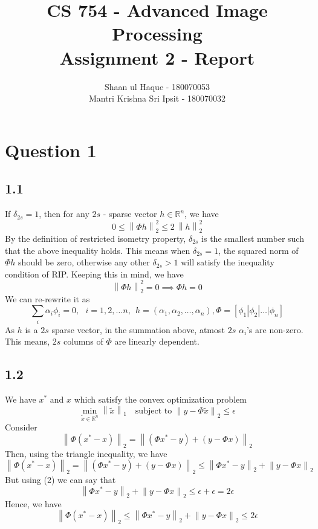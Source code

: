 \documentclass[12pt]{article}
\title{CS 754 - Advanced Image Processing\\Assignment 2 - Report}
\author{Shaan ul Haque - 180070053\\Mantri Krishna Sri Ipsit - 180070032}
\newcommand{\norm}[1]{\left\lVert #1 \right\rVert}
\newcommand{\R}{\mathbb{R}}
\begin{document}
\maketitle

\section*{Question 1}
\subsection*{1.1}
If $\delta_{2s} = 1$, then for any $2s$ - sparse vector $h \in \R^n$, we have
\begin{equation}
0 \leq \norm{\Phi h}_2^2 \leq 2\: \norm{h}_2^2
\end{equation}
By the definition of restricted isometry property, $\delta_{2s}$ is the smallest number such that the above inequality holds. This means when $\delta_{2s} = 1$, the squared norm of $\Phi h$ should be zero, otherwise any other $\delta_{2s} > 1$ will satisfy the inequality condition of RIP. Keeping this in mind, we have
$$\norm{\Phi h}_2^2 = 0 \implies \Phi h = 0$$
We can re-rewrite it as
$$\sum \limits_{i}\alpha_i \phi_i = 0, \:\:\: i=1,2,\ldots n, \:\: h=(\alpha_1, \alpha_2, \ldots, \alpha_n), \Phi = [\phi_1|\phi_2|\ldots|\phi_n]$$
As $h$ is a $2s$ sparse vector, in the summation above, atmost $2s$ $\alpha_i$'s are non-zero. This means, $2s$ columns of $\Phi$ are linearly dependent. 
\subsection*{1.2}
We have $x^*$ and $x$ which satisfy the convex optimization problem
\begin{equation}
\min _{\tilde{x}\in \R^n} \norm{\tilde{x}}_1 \:\:\: \text{ subject to } \norm{y - \Phi \tilde{x}}_2 \leq \epsilon
\end{equation}
Consider
$$\norm{\Phi(x^* - x)}_2 = \norm{(\Phi x^* - y) + (y - \Phi x)}_2$$
Then, using the triangle inequality, we have
$$\norm{\Phi(x^* - x)}_2 = \norm{(\Phi x^* - y) + (y - \Phi x)}_2 \leq \norm{\Phi x^* - y}_2 + \norm{y-\Phi x}_2$$
But using (2) we can say that
$$\norm{\Phi x^* - y}_2 + \norm{y-\Phi x}_2 \leq \epsilon + \epsilon = 2\epsilon$$
Hence, we have
$$\norm{\Phi(x^* - x)}_2 \leq \norm{\Phi x^* - y}_2 + \norm{y-\Phi x}_2 \leq 2\epsilon$$
\end{document}
